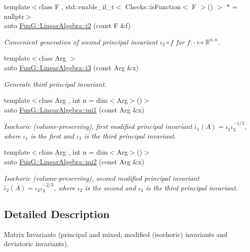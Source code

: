 \begin{DoxyCompactItemize}
{\footnotesize template$<$class F , std\+::enable\+\_\+if\+\_\+t$<$ Checks\+::is\+Function$<$ F $>$() $>$ $\ast$  = nullptr$>$ }\\auto \hyperlink{group__InvariantGroup_gad3987f97353c8696e602ed1915b3cf47}{Fun\+G\+::\+Linear\+Algebra\+::i2} (const F \&f)
\begin{DoxyCompactList}\small\item\em Convenient generation of second principal invariant $ \iota_2\circ f $ for $f:\cdot\mapsto\mathbb{R}^{n,n}$. \end{DoxyCompactList}\item 
{\footnotesize template$<$class Arg $>$ }\\auto \hyperlink{group__InvariantGroup_gae1ad80b4b2f34a10564114fad28bc313}{Fun\+G\+::\+Linear\+Algebra\+::i3} (const Arg \&x)
\begin{DoxyCompactList}\small\item\em Generate third principal invariant. \end{DoxyCompactList}\item 
{\footnotesize template$<$class Arg , int n = dim$<$\+Arg$>$()$>$ }\\auto \hyperlink{group__InvariantGroup_ga7eed5e2661171d81e192ac1db791244c}{Fun\+G\+::\+Linear\+Algebra\+::mi1} (const Arg \&x)
\begin{DoxyCompactList}\small\item\em Isochoric (volume-\/preserving), first modified principal invariant $ \bar\iota_1(A)=\iota_1\iota_3^{-1/3} $, where $\iota_1$ is the first and $\iota_3$ is the third principal invariant. \end{DoxyCompactList}\item 
{\footnotesize template$<$class Arg , int n = dim$<$\+Arg$>$()$>$ }\\auto \hyperlink{group__InvariantGroup_ga9d219c5c48cce1d3af60345916963524}{Fun\+G\+::\+Linear\+Algebra\+::mi2} (const Arg \&x)
\begin{DoxyCompactList}\small\item\em Isochoric (volume-\/preserving), second modified principal invariant $ \bar\iota_2(A)=\iota_2\iota_3^{-2/3} $, where $\iota_2$ is the second and $\iota_3$ is the third principal invariant. \end{DoxyCompactList}\end{DoxyCompactItemize}


\subsection{Detailed Description}
Matrix Invariants (principal and mixed, modified (isochoric) invariants and deviatoric invariants). 



